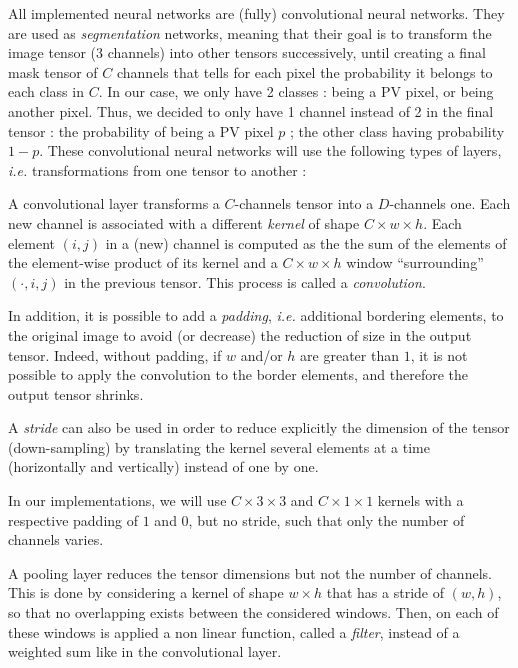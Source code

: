 \documentclass[twocolumn,superscriptaddress,aps,nofootinbib]{revtex4-1}
\begin{document}
All implemented neural networks are (fully) convolutional neural networks. They are used as \emph{segmentation} networks, meaning that their goal is to transform the image tensor (3 channels) into other tensors successively, until creating a final mask tensor of $C$ channels that tells for each pixel the probability it belongs to each class in $C$. In our case, we only have 2 classes : being a PV pixel, or being another pixel. Thus, we decided to only have 1 channel instead of 2 in the final tensor : the probability of being a PV pixel $p$ ; the other class having probability $1 - p$. These convolutional neural networks will use the following types of layers, \emph{i.e.} transformations from one tensor to another :
\begin{description}[leftmargin=*]
    \item[Convolutional] A convolutional layer transforms a $C$-channels tensor into a $D$-channels one. Each new channel is associated with a different \emph{kernel} of shape $C \times w \times h$. Each element $(i, j)$ in a (new) channel is computed as the the sum of the elements of the element-wise product of its kernel and a $C \times w \times h$ window \enquote{surrounding} $(\cdot, i, j)$ in the previous tensor. This process is called a \emph{convolution}.

    In addition, it is possible to add a \emph{padding}, \emph{i.e.} additional bordering elements, to the original image to avoid (or decrease) the reduction of size in the output tensor. Indeed, without padding, if $w$ and/or $h$ are greater than $1$, it is not possible to apply the convolution to the border elements, and therefore the output tensor shrinks.

    A \emph{stride} can also be used in order to reduce explicitly the dimension of the tensor (down-sampling) by translating the kernel several elements at a time (horizontally and vertically) instead of one by one.

    In our implementations, we will use $C \times 3 \times 3$ and $C \times 1 \times 1$ kernels with a respective padding of $1$ and $0$, but no stride, such that only the number of channels varies.
    \item[Pooling] A pooling layer reduces the tensor dimensions but not the number of channels. This is done by considering a kernel of shape $w \times h$ that has a stride of $(w, h)$, so that no overlapping exists between the considered windows. Then, on each of these windows is applied a non linear function, called a \emph{filter}, instead of a weighted sum like in the convolutional layer.


\end{description}
\end{document}
